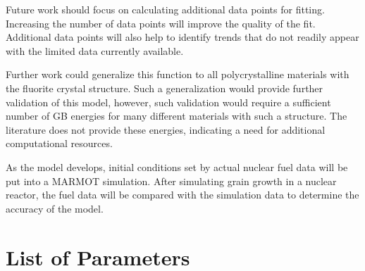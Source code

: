 \documentclass[twoside,senior]{BYUPhys}
\begin{document}
Future work should focus on calculating additional data points for fitting.  Increasing the number of data points will improve the quality of the fit.  Additional data points will also help to identify trends that do not readily appear with the limited data currently available. 

Further work could generalize this function to all polycrystalline materials with the fluorite crystal structure.  Such a generalization would provide further validation of this model, however, such validation would require a sufficient number of GB energies for many different materials with such a structure.  The literature does not provide these energies, indicating a need for additional computational resources.

As the model develops, initial conditions set by actual nuclear fuel data will be put into a MARMOT simulation.  After simulating grain growth in a nuclear reactor, the fuel data will be compared with the simulation data to determine the accuracy of the model.

\appendix
\renewcommand\chaptername{Appendix}

 \cleardoublepage
 

\chapter{List of Parameters\label{app:params}}
\end{document}
